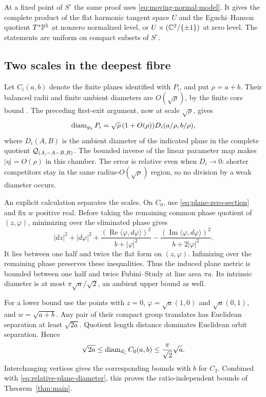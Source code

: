At a fixed point of $S^\circ$ the same proof
uses \eqref{eq:moving-normal-model}. It gives
the complete product of the flat harmonic
tangent space $U$ and the Eguchi--Hanson
quotient $T^*\mathbb P^1$ at nonzero normalized level,
or $U\times(\mathbb C^2/\{\pm1\})$ at zero level.
The statements are uniform on compact subsets
of $S^\circ$.

\subsection{Two scales in the deepest fibre}
Let $C_i(a,b)$ denote the finite planes identified
with $P_i$, and put $\rho=a+b$. Their balanced
radii and finite ambient diameters are
$O(\sqrt\rho)$, by the finite core bound
\cite[Section~6]{wuebben14}. The preceding
first-exit argument, now at scale $\sqrt\rho$,
gives
\begin{equation}\label{eq:relative-plane-diameter}
 \operatorname{diam}_{g_\eta}P_i
  =\sqrt\rho\,(1+O(\rho))
        D_i(a/\rho,b/\rho),
\end{equation}
where $D_i(A,B)$ is the ambient diameter of
the indicated plane in the complete quotient
$\mathcal Q_{(A,-A-B,B)}$. The bounded inverse of the
linear parameter map makes $|\eta|=O(\rho)$
in this chamber. The error is relative even
when $D_i\to0$: shorter competitors stay in
the same radius-$O(\sqrt\rho)$ region, so no
division by a weak diameter occurs.

An explicit calculation separates the scales.
On $C_0$, use \eqref{eq:plane-zero-section} and
fix $w$ positive real. Before taking the
remaining common phase quotient of $(z,\varphi)$,
minimizing over the eliminated phase gives
\begin{equation}\label{eq:plane-metric-form}
 |dz|^2+|d\varphi|^2
 +\frac{(\operatorname{Re}\langle\varphi,d\varphi\rangle)^2}
             {b+|\varphi|^2}
 -\frac{(\operatorname{Im}\langle\varphi,d\varphi\rangle)^2}
             {b+2|\varphi|^2}.
\end{equation}
It lies between one half and twice the flat
form on $(z,\varphi)$. Infimizing over the
remaining phase preserves these inequalities.
Thus the induced plane metric is bounded
between one half and twice Fubini--Study at
line area $\pi a$. Its intrinsic diameter is
at most $\pi\sqrt a/\sqrt2$, an ambient upper
bound as well.

For a lower bound use the points with $z=0$,
$\varphi=\sqrt a(1,0)$ and $\sqrt a(0,1)$,
and $w=\sqrt{a+b}$. Any pair of their compact
group translates has Euclidean separation at
least $\sqrt{2a}$. Quotient length distance
dominates Euclidean orbit separation. Hence
\begin{equation}\label{eq:uniform-plane-bounds}
 \sqrt{2a}\le\operatorname{diam}_{d_\zeta}C_0(a,b)
       \le\frac\pi{\sqrt2}\sqrt a.
\end{equation}
Interchanging vertices gives the corresponding
bounds with $b$ for $C_2$. Combined with
\eqref{eq:relative-plane-diameter}, this proves
the ratio-independent bounds of
Theorem~\ref{thm:main}.

